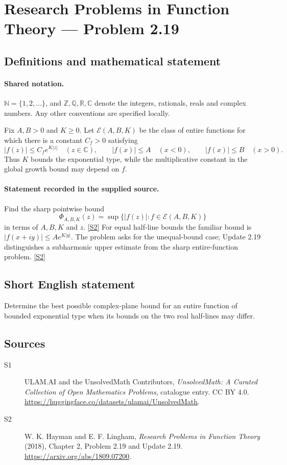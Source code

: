 \documentclass[11pt]{article}
\newcommand{\sref}[2]{\hyperlink{source:#1:#2}{[S#2]}}
\begin{document}
\section{Research Problems in Function Theory — Problem 2.19}\label{statement}

\subsection{Definitions and mathematical statement}

\paragraph{Shared notation.}$\mathbb N=\{1,2,\ldots\}$, and $\mathbb Z,\mathbb Q,\mathbb R,\mathbb C$ denote the integers, rationals, reals and complex numbers. Any other conventions are specified locally.


Fix $A,B>0$ and $K\ge0$. Let $\mathcal E(A,B,K)$ be the class of entire functions for which there is a constant $C_f>0$ satisfying
\[
 |f(z)|\le C_f e^{K|z|}\quad(z\in\mathbb C),\qquad
 |f(x)|\le A\quad(x<0),\qquad |f(x)|\le B\quad(x>0).
\]
Thus $K$ bounds the exponential type, while the multiplicative constant in the global growth bound may depend on $f$.

\paragraph{Statement recorded in the supplied source.}
Find the sharp pointwise bound
\[\Phi_{A,B,K}(z)=\sup\{|f(z)|:f\in\mathcal E(A,B,K)\}\]
in terms of $A,B,K$ and $z$. \sref{statement}{2}
For equal half-line bounds the familiar bound is $|f(x+iy)|\le A e^{K|y|}$. The problem asks for the unequal-bound case; Update 2.19 distinguishes a subharmonic upper estimate from the sharp entire-function problem. \sref{statement}{2}
\subsection{Short English statement}
Determine the best possible complex-plane bound for an entire function of bounded exponential type when its bounds on the two real half-lines may differ.
\subsection{Sources}
\begin{description}
\item[\hypertarget{source:statement:1}{S1}] ULAM.AI and the UnsolvedMath Contributors, \emph{UnsolvedMath: A Curated Collection of Open Mathematics Problems}, catalogue entry. CC BY 4.0. \url{https://huggingface.co/datasets/ulamai/UnsolvedMath}.
\item[\hypertarget{source:statement:2}{S2}] W. K. Hayman and E. F. Lingham, \emph{Research Problems in Function Theory} (2018), Chapter 2, Problem 2.19 and Update 2.19. \url{https://arxiv.org/abs/1809.07200}.
\end{description}
\label{end:statement}
\end{document}
